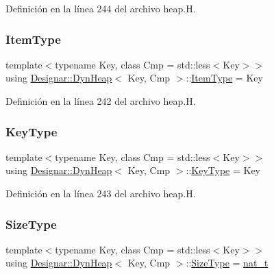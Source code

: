 Definición en la línea 244 del archivo heap.\+H.

\mbox{\label{class_designar_1_1_dyn_heap_a8b4add310e82b260912210069852febc}} 
\subsubsection{\texorpdfstring{Item\+Type}{ItemType}}
{\footnotesize\ttfamily template$<$typename Key, class Cmp = std\+::less$<$\+Key$>$$>$ \\
using \hyperlink{class_designar_1_1_dyn_heap}{Designar\+::\+Dyn\+Heap}$<$ Key, Cmp $>$\+::\hyperlink{class_designar_1_1_fixed_array_abfeb4e683cee75ae782ad20294c4c808}{Item\+Type} =  Key}



Definición en la línea 242 del archivo heap.\+H.

\mbox{\label{class_designar_1_1_dyn_heap_aa7260c4d35ad97e41f779bcf2b41808b}} 
\subsubsection{\texorpdfstring{Key\+Type}{KeyType}}
{\footnotesize\ttfamily template$<$typename Key, class Cmp = std\+::less$<$\+Key$>$$>$ \\
using \hyperlink{class_designar_1_1_dyn_heap}{Designar\+::\+Dyn\+Heap}$<$ Key, Cmp $>$\+::\hyperlink{class_designar_1_1_fixed_array_a3a725cf21783340b8aca29dd1db0acf0}{Key\+Type} =  Key}



Definición en la línea 243 del archivo heap.\+H.

\mbox{\label{class_designar_1_1_dyn_heap_aa5d0813645a3a87407d2c95f0f4d5cad}} 
\subsubsection{\texorpdfstring{Size\+Type}{SizeType}}
{\footnotesize\ttfamily template$<$typename Key, class Cmp = std\+::less$<$\+Key$>$$>$ \\
using \hyperlink{class_designar_1_1_dyn_heap}{Designar\+::\+Dyn\+Heap}$<$ Key, Cmp $>$\+::\hyperlink{class_designar_1_1_fixed_array_a503ae414cc313d248e77c08e62ef043c}{Size\+Type} =  \hyperlink{namespace_designar_aa72662848b9f4815e7bf31a7cf3e33d1}{nat\+\_\+t}}



